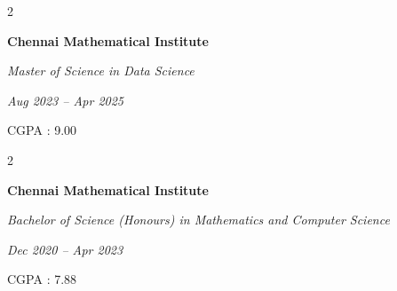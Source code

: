 \documentclass[10pt, letterpaper]{article}
\newenvironment{twocolentry}[2][]{
    \onecolentry
    \def\secondColumn{#2}
    \setcolumnwidth{\fill, 6.5 cm}
    \begin{paracol}{2}
}{
    \switchcolumn \raggedleft \secondColumn
    \end{paracol}
    \endonecolentry
} %
\begin{document}
        \vspace{0.3cm}

        \begin{twocolentry}{
            
        \textit{Aug 2023 – Apr 2025}
        
        CGPA : 9.00}
            \textbf{Chennai Mathematical Institute}

            \textit{Master of Science in Data Science}
        \end{twocolentry}

        \vspace{0.3cm}

        \begin{twocolentry}{
            
        \textit{Dec 2020 – Apr 2023}
        
        CGPA : 7.88}
            \textbf{Chennai Mathematical Institute}

            \textit{Bachelor of Science (Honours) in Mathematics and Computer Science}
        \end{twocolentry}


            
        


\end{document}
